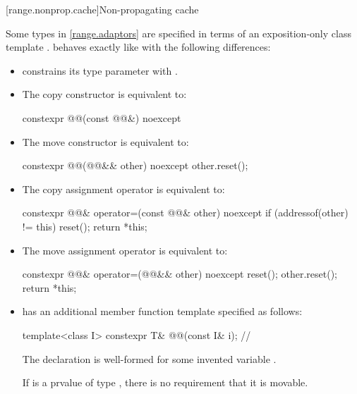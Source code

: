 [range.nonprop.cache]{Non-propagating cache}

\pnum
Some types in \ref{range.adaptors} are specified in terms of
an exposition-only class template .
 behaves exactly like 
with the following differences:
\begin{itemize}
\item
{} constrains its type parameter 
with .
\item
The copy constructor is equivalent to:
\begin{codeblock}
constexpr @@(const @@&) noexcept {}
\end{codeblock}
\item
The move constructor is equivalent to:
\begin{codeblock}
constexpr @@(@@&& other) noexcept {
  other.reset();
}
\end{codeblock}
\item
The copy assignment operator is equivalent to:
\begin{codeblock}
constexpr @@& operator=(const @@& other) noexcept {
  if (addressof(other) != this)
    reset();
  return *this;
}
\end{codeblock}
\item
The move assignment operator is equivalent to:
\begin{codeblock}
constexpr @@& operator=(@@&& other) noexcept {
  reset();
  other.reset();
  return *this;
}
\end{codeblock}
\item
{} has an additional member function template
specified as follows:
\begin{itemdecl}
template<class I>
  constexpr T& @@(const I& i);    // \expos
\end{itemdecl}

\begin{itemdescr}
 \mandates
The declaration  is well-formed
for some invented variable .
\begin{note}
If  is a prvalue of type \cv{} ,
there is no requirement that it is movable.
\end{note}


\end{itemdescr}
\end{itemize}
